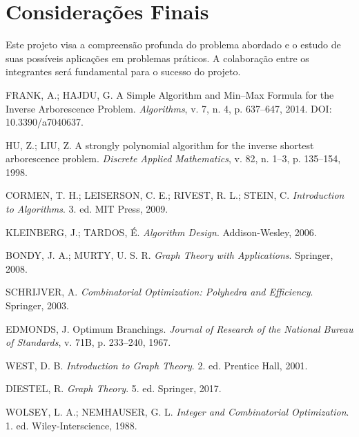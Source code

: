 \documentclass[12pt,a4paper]{article}
\begin{document}
\section{Considerações Finais}
Este projeto visa a compreensão profunda do problema abordado e o estudo de suas possíveis aplicações em problemas práticos. A colaboração entre os integrantes será fundamental para o sucesso do projeto.

\begin{thebibliography}{98}

 FRANK, A.; HAJDU, G. A Simple Algorithm and Min--Max Formula for the Inverse Arborescence Problem. \textit{Algorithms}, v. 7, n. 4, p. 637--647, 2014. DOI: 10.3390/a7040637.

 HU, Z.; LIU, Z. A strongly polynomial algorithm for the inverse shortest arborescence problem. \textit{Discrete Applied Mathematics}, v. 82, n. 1--3, p. 135--154, 1998.

 CORMEN, T. H.; LEISERSON, C. E.; RIVEST, R. L.; STEIN, C. \textit{Introduction to Algorithms}. 3. ed. MIT Press, 2009.

 KLEINBERG, J.; TARDOS, É. \textit{Algorithm Design}. Addison-Wesley, 2006.

 BONDY, J. A.; MURTY, U. S. R. \textit{Graph Theory with Applications}. Springer, 2008.

 SCHRIJVER, A. \textit{Combinatorial Optimization: Polyhedra and Efficiency}. Springer, 2003.

 EDMONDS, J. Optimum Branchings. \textit{Journal of Research of the National Bureau of Standards}, v. 71B, p. 233--240, 1967.

 WEST, D. B. \textit{Introduction to Graph Theory}. 2. ed. Prentice Hall, 2001.

 DIESTEL, R. \textit{Graph Theory}. 5. ed. Springer, 2017.

 WOLSEY, L. A.; NEMHAUSER, G. L. \textit{Integer and Combinatorial Optimization}. 1. ed. Wiley-Interscience, 1988.

\end{thebibliography}
\end{document}
